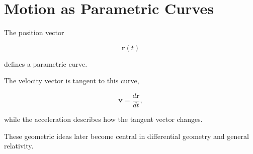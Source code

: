 \section{Motion as Parametric Curves}

The position vector

\[
\mathbf r(t)
\]

defines a parametric curve.

The velocity vector is tangent to this curve,

\[
\mathbf v
=
\frac{d\mathbf r}{dt},
\]

while the acceleration describes how the tangent vector changes.

These geometric ideas later become central in differential geometry and
general relativity.

